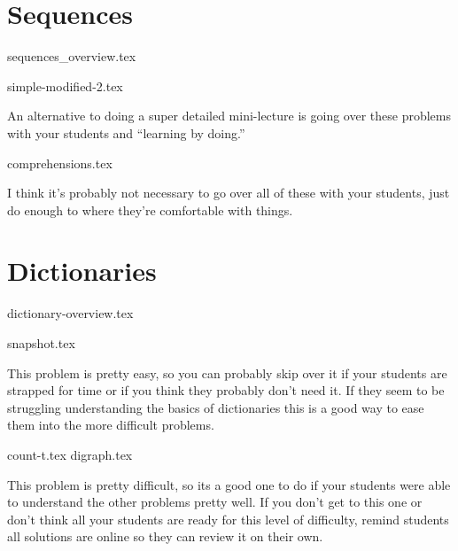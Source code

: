 \documentclass{exam}
\begin{document}
\section{Sequences}
{sequences_overview.tex}
\begin{questions}
    {simple-modified-2.tex}
    \begin{questionmeta}
        An alternative to doing a super detailed mini-lecture is going over these problems with your students and ``learning by doing.'' 
    \end{questionmeta}
    {comprehensions.tex}
    \begin{questionmeta}
        I think it's probably not necessary to go over all of these with your students, just do enough to where they're comfortable with things. 
    \end{questionmeta}
\end{questions}

\section{Dictionaries}
{dictionary-overview.tex}
\begin{questions}
    {snapshot.tex}
    \begin{questionmeta}
        This problem is pretty easy, so you can probably skip over it if your students are strapped for time or if you think they probably don't need it. If they seem to be struggling understanding the basics of dictionaries this is a good way to ease them into the more difficult problems.
    \end{questionmeta}
    {count-t.tex}
    {digraph.tex}
    \begin{questionmeta}
        This problem is pretty difficult, so its a good one to do if your students were able to understand the other problems pretty well. If you don't get to this one or don't think all your students are ready for this level of difficulty, remind students all solutions are online so they can review it on their own.
    \end{questionmeta}
\end{questions}
\end{document}
